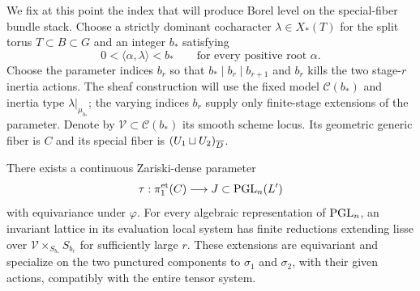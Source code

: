 We fix at this point the index that will produce Borel level on the
special-fiber bundle stack.  Choose a strictly dominant cocharacter
$\lambda\in X_*(T)$ for the split torus $T\subset B\subset G$ and an
integer $b_*$ satisfying
\begin{equation}\label{eq:alcove-index}
       0<\langle\alpha,\lambda\rangle<b_*
       \qquad\text{for every positive root }\alpha.
\end{equation}
Choose the parameter indices $b_r$ so that
$b_*\mid b_r\mid b_{r+1}$ and $b_r$ kills the two stage-$r$ inertia
actions.  The sheaf construction will use the fixed model
$\mathcal C(b_*)$ and inertia type $\lambda|_{\mu_{b_*}}$; the varying
indices $b_r$ supply only finite-stage extensions of the parameter.  Denote by
$\mathcal V\subset\mathcal C(b_*)$ its smooth scheme locus.  Its
geometric generic fiber is $C$ and its special fiber is
$(U_1\sqcup U_2)_{\overline D}$.

\begin{proposition}\label{prop:nodal-parameter}
There exists a continuous Zariski-dense parameter
\[
              \tau:\pi_1^{\mathrm{et}}(C)\longrightarrow J
                      \subset\mathrm{PGL}_n(L')
\]
with equivariance under $\varphi$.  For every algebraic representation
of $\mathrm{PGL}_n$, an invariant lattice in its evaluation local system has
finite reductions extending lisse over
$\mathcal V\times_{S_{b_*}}S_{b_r}$ for sufficiently large $r$.
These extensions are equivariant and specialize on the two punctured
components to $\sigma_1$ and $\sigma_2$, with their given actions,
compatibly with the entire tensor system.
\end{proposition}

